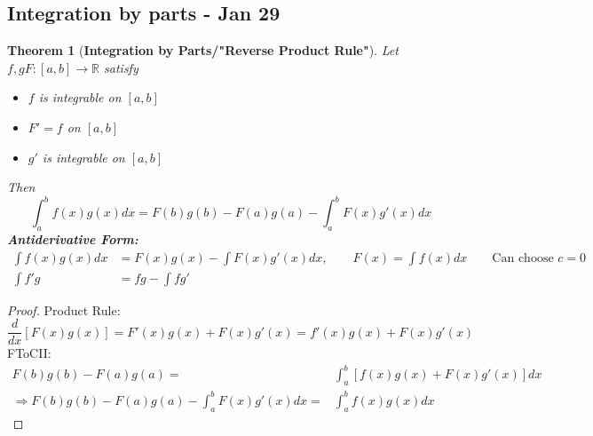 \documentclass[12pt]{article}
\theoremstyle{plain}
\newtheorem{theorem}{Theorem}[subsection]
\newcommand{\mR}{{\mathbb{R}}}
\begin{document}

\newpage
\subsection{Integration by parts - Jan 29}
\begin{theorem}[\textbf{Integration by Parts/"Reverse Product Rule"}]
	Let $f, g F:[a,b] \to \mR$ satisfy
	\begin{itemize}
		\item $f$ is integrable on $[a,b]$
		\item $F' = f$ on $[a,b]$
		\item $g'$ is integrable on $[a,b]$
	\end{itemize}
	Then 
	\[
		\int_a^b f(x)g(x)dx = F(b)g(b) - F(a)g(a) - \int_a^b F(x)g'(x)dx
	\]
	\textbf{Antiderivative Form: }
	\begin{align*}
		\int f(x)g(x)dx &= F(x)g(x) - \int F(x)g'(x)dx, \qquad 
			F(x) = \int f(x)dx \qquad \text{Can choose $c=0$}\\
		\int f'g &= fg-\int fg'
	\end{align*}
\end{theorem}
\begin{proof}
	Product Rule: 
	\[
		\frac{d}{dx} [F(x)g(x)] = F'(x)g(x) + F(x)g'(x)
		=f'(x)g(x) + F(x)g'(x)
	\]
	FToCII:
	\begin{align*}
		F(b)g(b) - F(a)g(a)
		=& \int_a^b [f(x)g(x) + F(x)g'(x)] dx\\
		\Rightarrow F(b)g(b) - F(a)g(a) - \int_a^b F(x)g'(x)dx
		=&\int_a^b f(x)g(x)dx
	\end{align*}
\end{proof}
\end{document}
